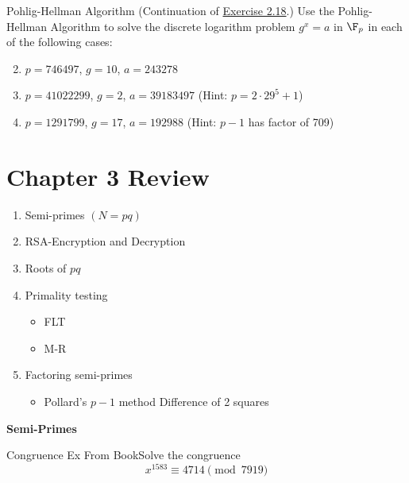 \begin{example}
    {Pohlig-Hellman Algorithm} (Continuation of \hyperlink{exerc:2.18}{Exercise 2.18}.) Use the Pohlig-Hellman Algorithm to solve the discrete logarithm problem \(g^x = a\) in \(\F_p\) in each of the following cases:
    \begin{enumerate}[label=(\alph*)]
        \setcounter{enumi}{1}
        \item \(p = 746497\), \(g = 10\), \(a = 243278\)
        \item \(p = 41022299\), \(g = 2\), \(a = 39183497\) (Hint: \(p = 2 \cdot 29^5 + 1\))
        \item \(p = 1291799\), \(g = 17\), \(a = 192988\) (Hint: \(p - 1\) has factor of 709)
    \end{enumerate}
\end{example}

\section*{Chapter 3 Review}

\begin{enumerate}
    \item Semi-primes \((N = pq)\)
    \item RSA-Encryption and Decryption
    \item Roots of \(pq\)
    \item Primality testing
          \begin{itemize}
              \item FLT
              \item M-R
          \end{itemize}
    \item Factoring semi-primes
          \begin{itemize}
              \item Pollard's \(p - 1\) method
                    Difference of 2 squares
          \end{itemize}
\end{enumerate}

\begin{center}
    \textbf{Semi-Primes}
\end{center}

\begin{example}
    {Congruence Ex From Book}Solve the congruence
    \[
        x^{1583} \equiv 4714 \pmod{7919}
    \]
\end{example}

